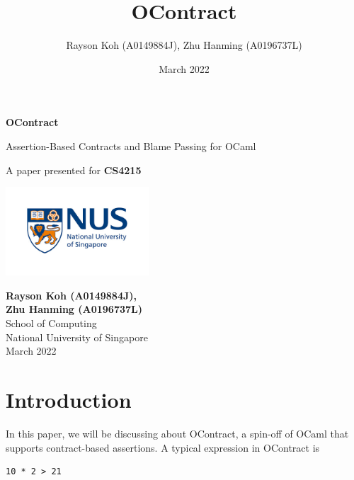 \documentclass[a4paper]{article}
\title{OContract}
\author{Rayson Koh (A0149884J), Zhu Hanming (A0196737L)}
\date{March 2022}
\begin{document}

\begin{titlepage}
    \begin{center}
        \vspace*{1cm}
            
        \Huge
        \textbf{OContract}
            
        \vspace{0.5cm}
        \LARGE
        Assertion-Based Contracts and Blame Passing for OCaml

        \vspace{1.5cm}


        \vfill
            
        A paper presented for \textbf{CS4215}
            
        \vspace{0.8cm}
            
        \includegraphics[width=0.4\textwidth]{nus-logo.jpg}
            
        \Large
        \textbf{Rayson Koh (A0149884J),\\Zhu Hanming (A0196737L)}\\
        School of Computing\\
        National University of Singapore\\
        March 2022
            
    \end{center}
\end{titlepage}

\tableofcontents
\newpage
    
\section{Introduction}

In this paper, we will be discussing about OContract, a spin-off of OCaml that supports contract-based assertions.
A typical expression in OContract is

\begin{verbatim}
10 * 2 > 21
\end{verbatim}
\end{document}
